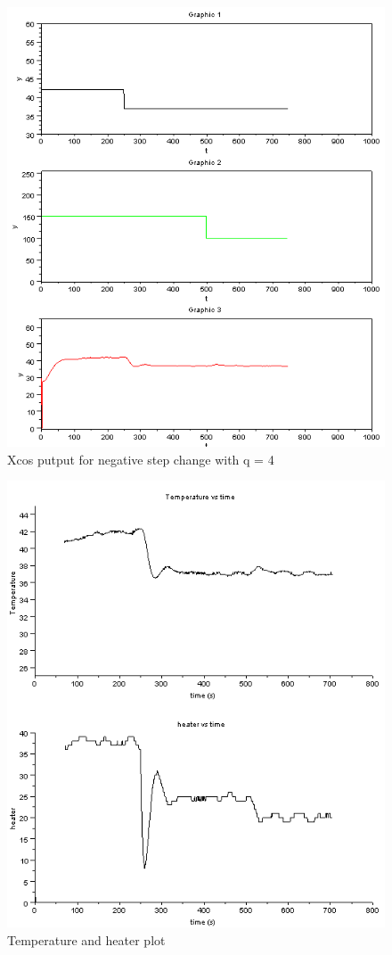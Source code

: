 \begin{figure}[H]
\centering
  \includegraphics[width=0.8\linewidth]{mpc/4_3.PNG}
  \caption{Xcos putput for negative step change with q = 4}
\end{figure}
\begin{figure}[H]
\centering
  \includegraphics[width=0.8\linewidth]{mpc/4_3_heater_final.png}
  \caption{Temperature and heater plot}
\end{figure}


